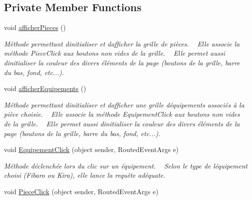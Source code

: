 \subsection*{Private Member Functions}
\begin{DoxyCompactItemize}
\item 
void \hyperlink{class_my_domotik_1_1_main_page_ace0e2623b105451a4ecce4725357e0d3}{afficher\+Pieces} ()
\begin{DoxyCompactList}\small\item\em Méthode permettant d\textquotesingle{}initialiser et d\textquotesingle{}afficher la grille de pièces. ~\newline
Elle associe la méthode Piece\+Click aux boutons non vides de la grille. ~\newline
Elle permet aussi d\textquotesingle{}initialiser la couleur des divers éléments de la page (boutons de la grille, barre du bas, fond, etc...). \end{DoxyCompactList}\item 
void \hyperlink{class_my_domotik_1_1_main_page_a277458cf599fde6ddd7752b21a926abf}{afficher\+Equipements} ()
\begin{DoxyCompactList}\small\item\em Méthode permettant d\textquotesingle{}initialiser et d\textquotesingle{}afficher une grille d\textquotesingle{}équipements associés à la pièce choisie. ~\newline
Elle associe la méthode Equipement\+Click aux boutons non vides de la grille. ~\newline
Elle permet aussi d\textquotesingle{}initialiser la couleur des divers éléments de la page (boutons de la grille, barre du bas, fond, etc...). ~\newline
\end{DoxyCompactList}\item 
void \hyperlink{class_my_domotik_1_1_main_page_a37d2eb04139c81a2f7ac428f9ee86659}{Equipement\+Click} (object sender, Routed\+Event\+Args e)
\begin{DoxyCompactList}\small\item\em Méthode déclenchée lors du clic sur un équipement. ~\newline
Selon le type de l\textquotesingle{}équipement choisi (Fibaro ou Kira), elle lance la requête adéquate. \end{DoxyCompactList}\item 
void \hyperlink{class_my_domotik_1_1_main_page_a05eafbdab6af1857a7678ef57e8e8260}{Piece\+Click} (object sender, Routed\+Event\+Args e)

\end{DoxyCompactItemize}
